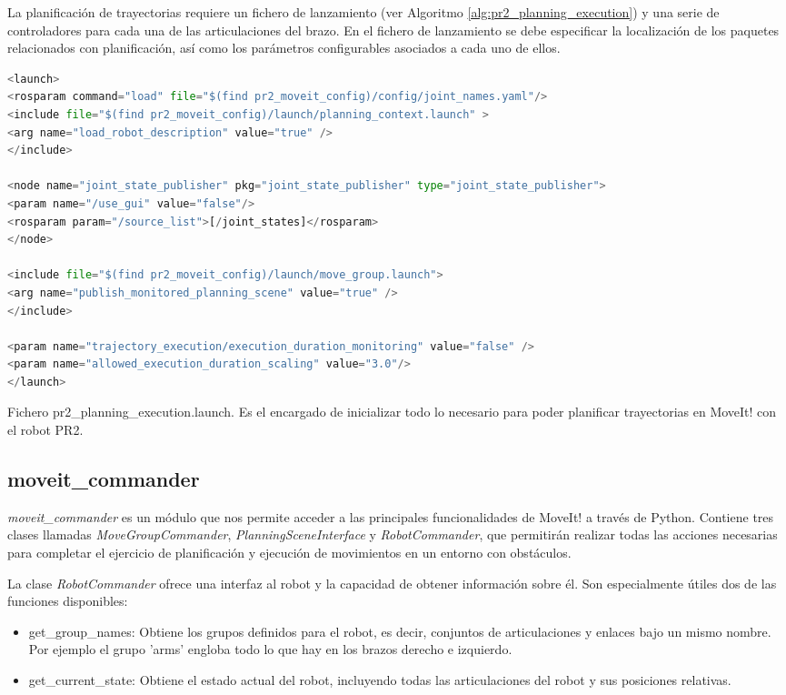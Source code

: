 \documentclass[12pt,spanish,chapterprefix, numbers=noenddot]{book}
\numberwithin{equation}{section}
\numberwithin{figure}{section}
\begin{document}
La planificación de trayectorias requiere un fichero de lanzamiento (ver Algoritmo \ref{alg:pr2_planning_execution}) y una serie de controladores para cada una de las articulaciones del brazo. 
En el fichero de lanzamiento se debe especificar la localización de los paquetes relacionados con planificación, así como los parámetros configurables asociados a cada uno de ellos. 

\begin{algorithm}[htb!]
	\begin{lstlisting}[breaklines=true,language=python]  
<launch>
<rosparam command="load" file="$(find pr2_moveit_config)/config/joint_names.yaml"/>
<include file="$(find pr2_moveit_config)/launch/planning_context.launch" >
<arg name="load_robot_description" value="true" />
</include>

<node name="joint_state_publisher" pkg="joint_state_publisher" type="joint_state_publisher">
<param name="/use_gui" value="false"/>
<rosparam param="/source_list">[/joint_states]</rosparam>
</node>

<include file="$(find pr2_moveit_config)/launch/move_group.launch">
<arg name="publish_monitored_planning_scene" value="true" />
</include>

<param name="trajectory_execution/execution_duration_monitoring" value="false" />
<param name="allowed_execution_duration_scaling" value="3.0"/>
</launch>
	\end{lstlisting}
\caption{\label{alg:pr2_planning_execution}Fichero pr2\_planning\_execution.launch. Es el encargado de inicializar todo lo necesario para poder planificar trayectorias en MoveIt! con el robot PR2.}
\end{algorithm}

\subsection{moveit\_commander}
\textit{moveit\_commander} es un módulo que nos permite acceder a las principales funcionalidades de MoveIt! a través de Python. Contiene tres clases llamadas  \textit{MoveGroupCommander}, \textit{PlanningSceneInterface} y \textit{RobotCommander}, que permitirán realizar todas las acciones necesarias para completar el ejercicio de planificación y ejecución de movimientos en un entorno con obstáculos. 

La clase \textit{RobotCommander} ofrece una interfaz al robot y la capacidad de obtener información sobre él. Son especialmente útiles dos de las funciones disponibles: 
\begin{itemize}
\item get\_group\_names: Obtiene los grupos definidos para el robot, es decir, conjuntos de articulaciones y enlaces bajo un mismo nombre.  Por ejemplo el grupo 'arms' engloba todo lo que hay en los brazos derecho e izquierdo. 
\item get\_current\_state: Obtiene el estado actual del robot, incluyendo todas las articulaciones del robot y sus posiciones relativas. 
\end{itemize}
\end{document}
